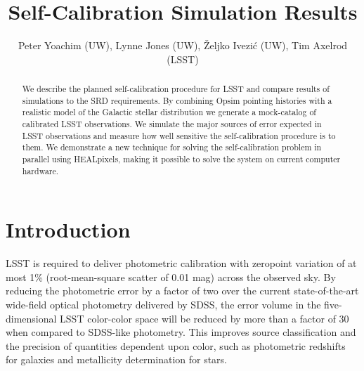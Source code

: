 \documentclass[12pt,preprint]{aastex}
\begin{document}
\title{Self-Calibration Simulation Results}
\author{Peter Yoachim (UW), Lynne Jones (UW),
\v{Z}eljko Ivezi\'{c} (UW), Tim Axelrod (LSST)}

\begin{abstract}
We describe the planned self-calibration procedure for LSST and compare results of simulations to the SRD requirements.  By combining Opsim pointing histories with a realistic model of the Galactic stellar distribution we generate a mock-catalog of calibrated LSST observations.  We simulate the major sources of error expected in LSST observations and measure how well sensitive the self-calibration procedure is to them.  We demonstrate a new technique for solving the self-calibration problem in parallel using HEALpixels, making it possible to solve the system on current computer hardware.

\end{abstract}


\section{Introduction}


LSST is required to deliver photometric calibration with zeropoint
variation of at most 1\% (root-mean-square scatter of 0.01 mag) across
the observed sky.  By reducing the photometric error by a factor of
two over the current state-of-the-art wide-field optical photometry
delivered by SDSS, the error volume in the five-dimensional LSST
color-color space will be reduced by more than a factor of 30 when
compared to SDSS-like photometry. This improves source classification
and the precision of quantities dependent upon color, such as
photometric redshifts for galaxies and metallicity determination for
stars.
\end{document}
